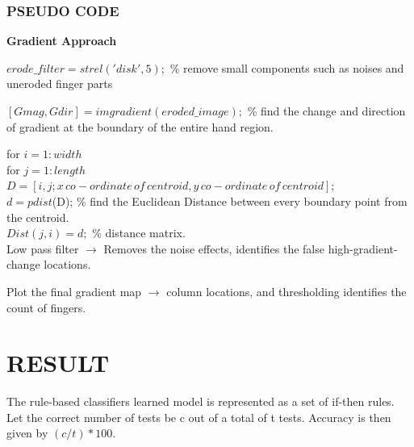 \documentclass[conference]{IEEEtran}
\begin{document}
\subsubsection{PSEUDO CODE}
\textbf{Gradient Approach}
\begin{flushleft}


$erode\_filter= strel('disk',5);$ \% remove small components such as noises and uneroded finger parts
 
$[Gmag, Gdir] = imgradient(eroded \_ image); $ \% find the change and direction of gradient at the boundary of the entire hand region. 

for $i=1:width$\\
\quad for $j=1:length$\\
\quad \quad$D=[i,j;x \, co-ordinate \, of \, centroid,y \, co-ordinate \, of \, centroid]$;\\
\quad \quad$d=pdist$(D); \% find the Euclidean Distance between every boundary point from the centroid.\\
\quad \quad $Dist(j,i)=d;$ \% distance matrix.\\
Low pass filter $\rightarrow$ Removes the noise effects, identifies the false high-gradient-change locations.

Plot the final gradient map $\rightarrow$ column locations, and thresholding identifies the count of fingers.
\end{flushleft}
\section{RESULT}
The rule-based classifiers learned model is represented as a set of if-then rules. Let the correct number of tests be c out of a total of t tests.
Accuracy is then given by $(c/t)*100$.
\end{document}

